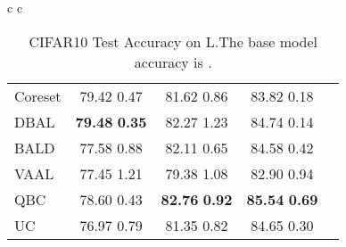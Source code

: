 \documentclass[10pt,twocolumn,letterpaper]{article}
\begin{document}
\begin{table}[ht]
\begin{center}
\begin{tabular}{c c}
\begin{minipage}{0.5\linewidth}
{\begin{tabular}{l|cccc}
        Coreset & 79.42  0.47 & 81.62  0.86 & 83.82  0.18\\
        DBAL & \textbf{79.48}  \textbf{0.35} & 82.27  1.23 & 84.74  0.14 \\
        BALD & 77.58  0.88 & 82.11  0.65 & 84.58  0.42\\
        VAAL & 77.45  1.21 & 79.38  1.08 & 82.90  0.94\\
        QBC & 78.60  0.43 & \textbf{82.76}  \textbf{0.92} & \textbf{85.54}  \textbf{0.69}\\
        UC & 76.97  0.79 & 81.35  0.82 & 84.65  0.30 \\
        \bottomrule
        \end{tabular}}
        \caption{CIFAR10 Test Accuracy on L.The base model accuracy is .}
        \label{tab:CIFAR10_exp_budget_10k_1}
        
    \end{minipage}
    
        
        \end{tabular}
        
\end{center}
\end{table}
\end{document}
